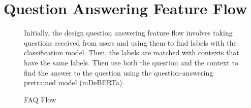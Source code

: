 \documentclass[12pt,oneside,openright,a4paper]{cpe-english-project}
\begin{document}
  \section{Question Answering Feature Flow}  
    \begin{figure}[H]
      \centering
      \caption{FAQ Flow}\label{fig:FAQ Flow}
      \begin{justify}
        \qquad Initially, the design question answering feature flow involves taking questions received from users and using them to find labels with the classification model. Then, the labels are matched with contexts that have the same labels. Then use both the question and the context to find the answer to the question using the question-answering pretrained model (mDeBERTa). \par
      \end{justify}
    \end{figure}
\end{document}
